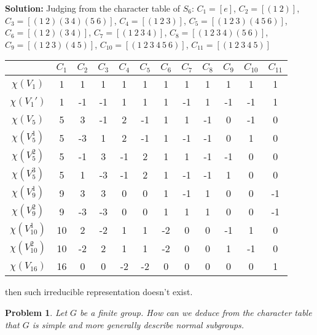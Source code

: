 \documentclass[12pt]{article}
\newtheorem{problem}{Problem}
\begin{document}
\textbf{Solution:} Judging from the character table of $S_6$: $C_1=[e]$, $C_2=[(1\ 2)]$, $C_3=[(1\ 2)(3\ 4)(5\ 6)]$, $C_4=[(1\ 2\ 3)]$, $C_5=[(1\ 2\ 3)(4\ 5\ 6)]$, $C_6=[(1\ 2)(3\ 4)]$, $C_7=[(1\ 2\ 3\ 4)]$, $C_8=[(1\ 2\ 3\ 4)(5\ 6)]$, $C_9=[(1\ 2\ 3)(4\ 5)]$, $C_{10}=[(1\ 2\ 3\ 4\ 5\ 6)]$, $C_{11}=[(1\ 2\ 3\ 4\ 5)]$
\begin{center}
\begin{tabular}{||c c c c c c c c c c c c||} 
 \hline
  & $C_1$ & $C_2$ & $C_3$ & $C_4$ & $C_5$ & $C_6$ & $C_7$ & $C_8$ & $C_9$ & $C_{10}$ & $C_{11}$\\ [0.5ex] 
 \hline\hline
 $\chi(V_1)$ & 1 & 1 & 1 & 1 & 1 & 1 & 1 & 1 & 1 & 1 & 1\\ 
 \hline
 $\chi(V_1')$ & 1 & -1 & -1 & 1 & 1 & 1 & -1 & 1 & -1 & -1 & 1\\
 \hline
 $\chi(V_5)$ & 5 & 3 & -1 & 2 & -1 & 1 & 1 & -1 & 0 & -1 & 0\\
 \hline
 $\chi(V_5^1)$ & 5 & -3 & 1 & 2 & -1 & 1 & -1 & -1 & 0 & 1 & 0\\
 \hline
 $\chi(V_5^2)$ & 5 & -1 & 3 & -1 & 2 & 1 & 1 & -1 & -1 & 0 & 0\\
 \hline
 $\chi(V_5^3)$ & 5 & 1 & -3 & -1 & 2 & 1 & -1 & -1 & 1 & 0 & 0 \\
 \hline
 $\chi(V_9^1)$ & 9 & 3 & 3 & 0 & 0 & 1 & -1 & 1 & 0 & 0 & -1 \\
 \hline
 $\chi(V_9^2)$ & 9 & -3 & -3 & 0 & 0 & 1 & 1 & 1 & 0 & 0 & -1 \\
 \hline
 $\chi(V_{10}^1)$ & 10 & 2 & -2 & 1 & 1 & -2 & 0 & 0 & -1 & 1 & 0 \\
 \hline
 $\chi(V_{10}^2)$ & 10 & -2 & 2 & 1 & 1 & -2 & 0 & 0 & 1 & -1 & 0 \\
 \hline
 $\chi(V_16)$ & 16 & 0 & 0 & -2 & -2 & 0 & 0 & 0 & 0 & 0 & 1 \\
 \hline
\end{tabular}
\end{center} then such irreducible representation doesn't exist.
\\
\begin{problem}
Let $G$ be a finite group. How can we deduce from the character table that $G$ is simple and more generally describe normal subgroups. 
\end{problem}
\end{document}
